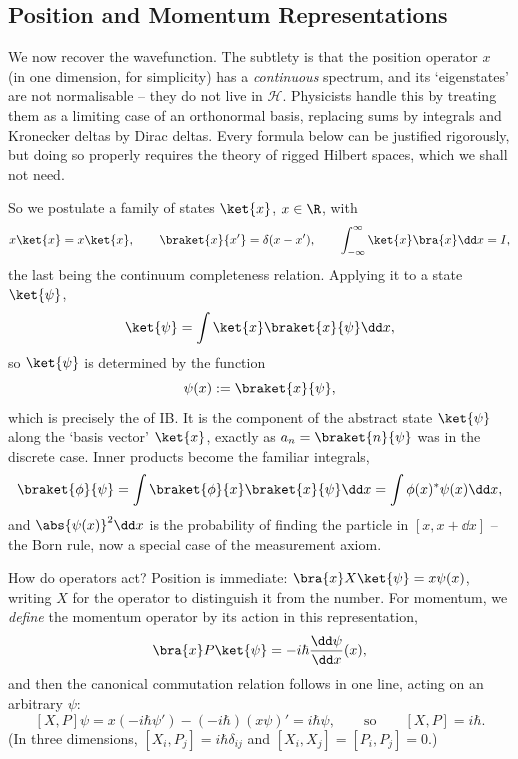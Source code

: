\subsection{Position and Momentum Representations}\label{sec:reps}

We now recover the wavefunction. The subtlety is that the position operator $x$ (in one dimension, for simplicity) has a \emph{continuous} spectrum, and its `eigenstates' are not normalisable -- they do not live in $\mathcal{H}$. Physicists handle this by treating them as a limiting case of an orthonormal basis, replacing sums by integrals and Kronecker deltas by Dirac deltas. Every formula below can be justified rigorously, but doing so properly requires the theory of rigged Hilbert spaces, which we shall not need.

So we postulate a family of states $\ket{x}$, $x \in \R$, with
$$
x \ket{x} = x\ket{x}, \qquad \braket{x}{x'} = \delta(x - x'), \qquad \int_{-\infty}^{\infty} \ket{x}\bra{x} \dd x = I,
$$
the last being the continuum completeness relation. Applying it to a state $\ket{\psi}$,
$$
\ket{\psi} = \int \ket{x}\braket{x}{\psi} \dd x,
$$
so $\ket{\psi}$ is determined by the function
$$
\psi(x) := \braket{x}{\psi},
$$
which is precisely the  of IB. It is the component of the abstract state $\ket{\psi}$ along the `basis vector' $\ket{x}$, exactly as $a_n = \braket{n}{\psi}$ was in the discrete case. Inner products become the familiar integrals,
$$
\braket{\phi}{\psi} = \int \braket{\phi}{x}\braket{x}{\psi} \dd x = \int \phi(x)^* \psi(x) \dd x,
$$
and $\abs{\psi(x)}^2 \dd x$ is the probability of finding the particle in $[x, x+\dd x]$ -- the Born rule, now a special case of the measurement axiom.

How do operators act? Position is immediate: $\bra{x} X \ket{\psi} = x \psi(x)$, writing $X$ for the operator to distinguish it from the number. For momentum, we \emph{define} the momentum operator by its action in this representation,
$$
\bra{x}P\ket{\psi} = -i\hbar \frac{\dd \psi}{\dd x}(x),
$$
and then the canonical commutation relation follows in one line, acting on an arbitrary $\psi$:
$$
[X,P]\psi = x(-i\hbar \psi') - (-i\hbar)(x\psi)' = i\hbar \psi, \qquad \text{so} \qquad [X,P] = i\hbar.
$$
(In three dimensions, $[X_i, P_j] = i\hbar \delta_{ij}$ and $[X_i,X_j] = [P_i,P_j] = 0$.)

